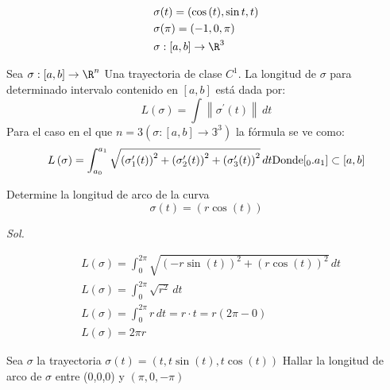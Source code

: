 \begin{align*}
	 & \sigma(t)=\left(\cos{(t)},\sin{t},t\right) \\
	 & \sigma(\pi)=(-1,0,\pi)                     \\
	 & \sigma:\left[a,b\right]\to \R^3
\end{align*}

\begin{definition}
	Sea $\sigma:\left[a,b\right]\to\R^n$ Una trayectoria de clase $C^1$. La longitud de
	$\sigma$ para determinado intervalo contenido en $\left[a,b\right]$ está dada por:
	\begin{equation}
		L\left(\sigma\right)=\int \left\lVert \sigma^{\prime}(t)\right\rVert\,dt
	\end{equation}
	Para el caso en el que $n=3\left(\sigma:\left[a,b\right]\to \mathbb{3}^3\right)$ la fórmula se ve como:
	\begin{equation*}
		L\left(\sigma\right)=\int_{a_0}^{a_1}\sqrt{\left(\sigma_1^{\prime}(t)\right)^2+\left(\sigma_2^{\prime}(t)\right)^2+\left(\sigma_3^{\prime}(t)\right)^2}\, dt\\
		\text{Donde} [_0.a_1]\subset \left[a,b\right]
	\end{equation*}
\end{definition}


\begin{problem}
Determine la longitud de arco de la curva
\begin{equation*}
	\sigma(t)=\left(r\cos{(t)}\right)
\end{equation*}
\end{problem}


\textit{ Sol. }

\begin{align*}
	 & L\left(\sigma\right)=\int_{0}^{2\pi}\sqrt{\left(-r\sin{(t)}\right)^2+\left(r\cos{(t)}\right)^2}\, dt \\
	 & L\left(\sigma\right)=\int_{0}^{2\pi} \sqrt{r^2}\, dt                                                 \\
	 & L\left(\sigma\right)=\int_{0}^{2\pi} r\, dt=r\cdot t=r(2\pi -0)                                      \\
	 & L\left(\sigma\right)=2\pi r
\end{align*}


\begin{problem}
Sea $\sigma$ la trayectoria $\sigma(t)=\left(t,t\sin{(t)},t\cos{(t)}\right)$
Hallar la longitud de arco de $\sigma$ entre (0,0,0) y $(\pi,0,-\pi)$
\end{problem}

